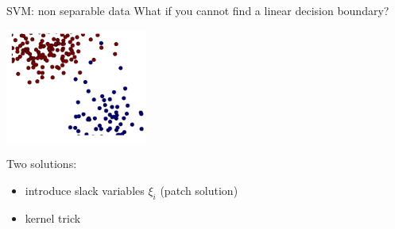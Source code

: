 \begin{frame}{SVM: non separable data}
What if you cannot find a linear decision boundary?
\begin{center}
\includegraphics[width=0.35\textwidth]{img/svm/non_linear_data.pdf}
\end{center}
Two solutions:
\begin{itemize}
\item introduce slack variables $\xi_i$ (patch solution)
\item kernel trick
\end{itemize}
\end{frame}